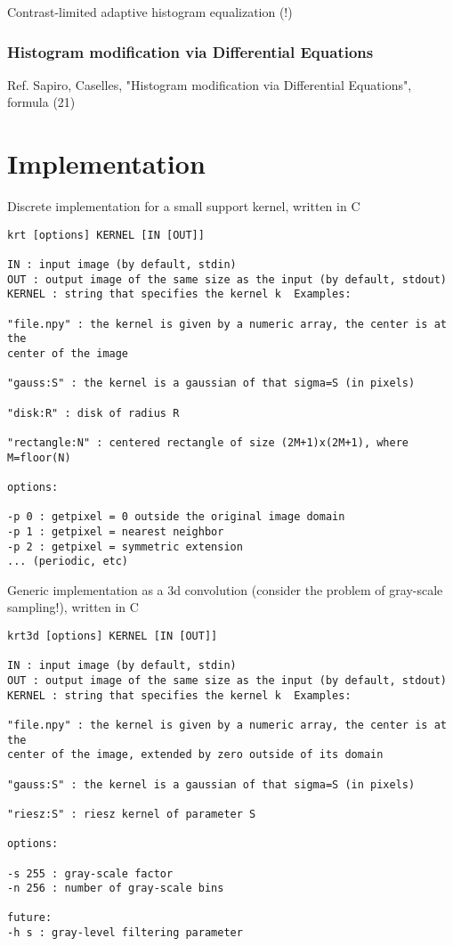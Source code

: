 \documentclass[12pt]{article}                  %
\begin{document}
Contrast-limited adaptive histogram equalization (!)


\subsubsection{Histogram modification via Differential Equations}

Ref. Sapiro, Caselles,  "Histogram modification via Differential Equations",
formula (21)

\section{Implementation}

Discrete implementation for a small support kernel, written in C

{\small
\begin{verbatim}
krt [options] KERNEL [IN [OUT]]

IN : input image (by default, stdin)
OUT : output image of the same size as the input (by default, stdout)
KERNEL : string that specifies the kernel k  Examples:

"file.npy" : the kernel is given by a numeric array, the center is at the
center of the image

"gauss:S" : the kernel is a gaussian of that sigma=S (in pixels)

"disk:R" : disk of radius R

"rectangle:N" : centered rectangle of size (2M+1)x(2M+1), where M=floor(N)

options:

-p 0 : getpixel = 0 outside the original image domain
-p 1 : getpixel = nearest neighbor
-p 2 : getpixel = symmetric extension
... (periodic, etc)

\end{verbatim}
}

Generic implementation as a 3d convolution (consider the problem of
gray-scale sampling!), written in C

{\small
\begin{verbatim}
krt3d [options] KERNEL [IN [OUT]]

IN : input image (by default, stdin)
OUT : output image of the same size as the input (by default, stdout)
KERNEL : string that specifies the kernel k  Examples:

"file.npy" : the kernel is given by a numeric array, the center is at the
center of the image, extended by zero outside of its domain

"gauss:S" : the kernel is a gaussian of that sigma=S (in pixels)

"riesz:S" : riesz kernel of parameter S

options:

-s 255 : gray-scale factor
-n 256 : number of gray-scale bins

future:
-h s : gray-level filtering parameter

\end{verbatim}
}
\end{document}
